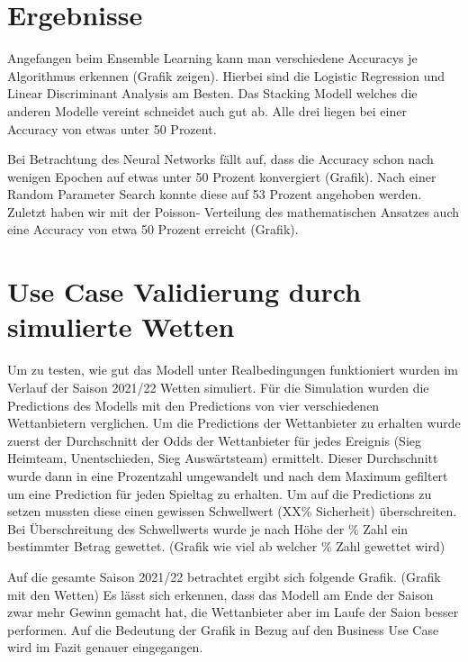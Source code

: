 \section{Ergebnisse}

Angefangen beim Ensemble Learning kann man verschiedene Accuracys
je Algorithmus erkennen (Grafik zeigen). Hierbei sind die Logistic
Regression und Linear Discriminant Analysis am Besten. Das
Stacking Modell welches die anderen Modelle vereint schneidet
auch gut ab. Alle drei liegen bei einer Accuracy von etwas unter
50 Prozent.

Bei Betrachtung des Neural Networks fällt auf, dass die Accuracy
schon nach wenigen Epochen auf etwas unter 50 Prozent konvergiert
(Grafik). Nach einer Random Parameter Search konnte diese auf 53
Prozent angehoben werden. Zuletzt haben wir mit der Poisson-
Verteilung des mathematischen Ansatzes auch eine Accuracy von
etwa 50 Prozent erreicht (Grafik).

\section{Use Case Validierung durch simulierte Wetten}

Um zu testen, wie gut das Modell unter Realbedingungen funktioniert
wurden im Verlauf der Saison 2021/22 Wetten simuliert. Für die
Simulation wurden die Predictions des Modells mit den Predictions von
vier verschiedenen Wettanbietern verglichen. Um die Predictions der
Wettanbieter zu erhalten wurde zuerst der Durchschnitt der Odds der
Wettanbieter für jedes Ereignis (Sieg Heimteam, Unentschieden, Sieg Auswärtsteam)
ermittelt. Dieser Durchschnitt wurde dann in eine Prozentzahl umgewandelt
und nach dem Maximum gefiltert um eine Prediction für jeden Spieltag zu erhalten.
Um auf die Predictions zu setzen mussten diese einen gewissen Schwellwert (XX\% Sicherheit) überschreiten.
Bei Überschreitung des Schwellwerts wurde je nach Höhe der \% Zahl ein bestimmter Betrag gewettet.
(Grafik wie viel ab welcher \% Zahl gewettet wird)

Auf die gesamte Saison 2021/22 betrachtet ergibt sich folgende Grafik.
(Grafik mit den Wetten)
Es lässt sich erkennen, dass das Modell am Ende der Saison zwar mehr Gewinn gemacht
hat, die Wettanbieter aber im Laufe der Saion besser performen. Auf die Bedeutung der Grafik
in Bezug auf den Business Use Case wird im Fazit genauer eingegangen.
